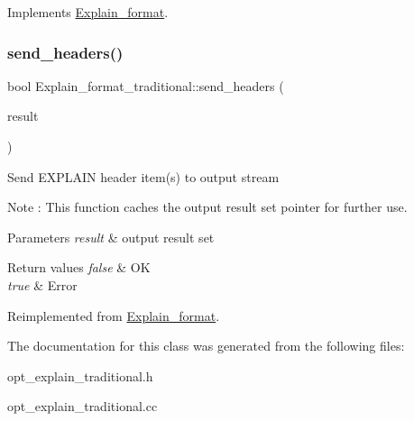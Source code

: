 Implements \mbox{\hyperlink{classExplain__format_a91ab0cd859549a7df55746df2491ca60}{Explain\+\_\+format}}.

\mbox{\label{classExplain__format__traditional_ae6c12bfd12a99873ea63fc791515eb24}} 
\subsubsection{\texorpdfstring{send\+\_\+headers()}{send\_headers()}}
{\footnotesize\ttfamily bool Explain\+\_\+format\+\_\+traditional\+::send\+\_\+headers (\begin{DoxyParamCaption}\item[{Query\+\_\+result $\ast$}]{result }\end{DoxyParamCaption})\hspace{0.3cm}{\ttfamily [virtual]}}

Send E\+X\+P\+L\+A\+IN header item(s) to output stream

\begin{DoxyNote}{Note}
\+: This function caches the output result set pointer for further use.
\end{DoxyNote}

\begin{DoxyParams}{Parameters}
{\em result} & output result set\\
\hline
\end{DoxyParams}

\begin{DoxyRetVals}{Return values}
{\em false} & OK \\
\hline
{\em true} & Error \\
\hline
\end{DoxyRetVals}


Reimplemented from \mbox{\hyperlink{classExplain__format_ae4808c82b9c88d94ede33477753917f3}{Explain\+\_\+format}}.



The documentation for this class was generated from the following files\+:\begin{DoxyCompactItemize}
\item 
opt\+\_\+explain\+\_\+traditional.\+h\item 
opt\+\_\+explain\+\_\+traditional.\+cc\end{DoxyCompactItemize}

